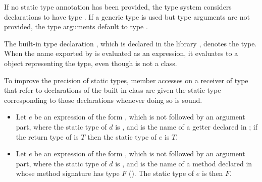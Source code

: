 \documentclass[makeidx]{article}
\begin{document}
{\LMHash{}%
If no static type annotation has been provided,
the type system considers declarations to have type \DYNAMIC.
If a generic type is used but type arguments are not provided,
the type arguments default to type \DYNAMIC.


\LMHash{}%
The built-in type declaration ,
which is declared in the library ,
denotes the \DYNAMIC{} type.
When the name \DYNAMIC{} exported by  is evaluated
as an expression,
it evaluates to a  object representing the \DYNAMIC{} type,
even though \DYNAMIC{} is not a class.


\LMHash{}%
To improve the precision of static types,
member accesses on a receiver of type \DYNAMIC{} that refer to
declarations of the built-in class 
are given the static type corresponding to those declarations
whenever doing so is sound.

\begin{itemize}
\item
  Let $e$ be an expression of the form ,
  which is not followed by an argument part,
  where the static type of $d$ is \DYNAMIC,
  and \id{} is the name of a getter declared in ;
  if the return type of  is $T$ then
  the static type of $e$ is $T$.

\item
  Let $e$ be an expression of the form ,
  which is not followed by an argument part,
  where the static type of $d$ is \DYNAMIC,
  and \id{} is the name of a method declared in 
  whose method signature has type $F$
  ().
  The static type of $e$ is then $F$.


\end{itemize}}
\end{document}
